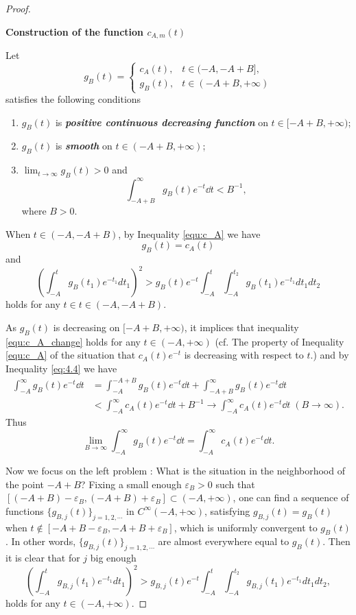 \documentclass[twoside,openany,12pt]{beautynote}
\newcommand{\itbf}[1]{\textbf{\itshape #1}}\newcommand{\supp}{\operatorname{Supp}}\newcommand{\xu}{\sqrt{-1}}
\begin{document}
\begin{proof}
  
  \begin{mdframed}
\begin{center}
  \textbf{Construction of the function $c_{A,m}(t)$}
\end{center}
Let 
\[
  g_B(t)=\begin{cases}
    c_A(t), & t\in (-A,-A+B],\\ 
    g_B(t), & t\in (-A+B,+\infty)
  \end{cases}
\]
satisfies the following conditions 
\begin{enumerate}
  \item $g_B(t)$ is \itbf{positive continuous decreasing function} on $t\in [-A+B,+\infty)$;
  \item $g_B(t)$ is \itbf{smooth} on $t\in (-A+B,+\infty)$;
  \item $\lim_{t\to\infty} g_B(t)>0$ and 
\begin{equation}
  \label{eq:4.4}
      \int_{-A+B}^{\infty} g_B(t) e^{-t} \dd t<B^{-1},
\end{equation}
  where $B>0$.
\end{enumerate}
  \end{mdframed}
When $t\in (-A,-A+B)$, by Inequality \eqref{equ:c_A} we have 
\[g_B(t)=c_A(t)\]
and 
\begin{equation}
  \label{equ:c_A_change}
  (\int_{-A}^{t}g_{B}(t_{1})e^{-t_{1}}dt_{1})^{2}>g_{B}(t)e^{-t}
  \int_{-A}^{t}\int_{-A}^{t_{2}}g_{B}(t_{1})e^{-t_{1}}dt_{1}dt_{2}
  \end{equation}
holds for any $t\in t\in (-A,-A+B)$.

As $g_B(t)$ is decreasing on $[-A+B,+\infty)$, it implices that inequality \eqref{equ:c_A_change} holds for any $t\in (-A,+\infty)$ (cf. The property of Inequality \eqref{equ:c_A} of the situation that $c_A(t)e^{-t}$ is decreasing with respect to $t$.) and by Inequality \eqref{eq:4.4} we have
\begin{align*}
  \int_{-A}^\infty g_B(t) e^{-t}\dd t &=\int_{-A}^{-A+B} g_B(t) e^{-t}\dd t +\int_{-A+B}^\infty g_B(t) e^{-t}\dd t\\ 
  &<\int_{-A}^\infty c_A(t) e^{-t}\dd t+B^{-1}\rightarrow \int_{-A}^\infty c_A(t) e^{-t}\dd t \;(B\to\infty).
\end{align*}
  Thus 
  \[
    \lim_{B\to\infty} \int_{-A}^\infty g_B(t) e^{-t}\dd t=\int_{-A}^\infty c_A(t) e^{-t}\dd t.
  \]

  Now we focus on the left problem : What is the situation in the neighborhood of the point $-A+B$? Fixing a small enough $\varepsilon_B>0$ such that $[(-A+B)-\varepsilon_B,(-A+B)+\varepsilon_B]\subset (-A,+\infty)$, one can find a sequence of functions
  $\{g_{B,j}(t)\}_{j=1,2,\cdots}$ in $C^{\infty}(-A,+\infty)$,
  satisfying $g_{B,j}(t)=g_{B}(t)$ when
  $t\notin[-A+B-\varepsilon_{B},-A+B+\varepsilon_{B}]$, which is
  uniformly convergent to $g_{B}(t)$. In other words, $\{g_{B,j}(t)\}_{j=1,2,\cdots}$ are almost everywhere equal to $g_B(t)$. Then it is clear that for $j$ big
  enough
  $$(\int_{-A}^{t}g_{B,j}(t_{1})e^{-t_{1}}dt_{1})^{2}
  >g_{B,j}(t)e^{-t}\int_{-A}^{t}
  \int_{-A}^{t_{2}}g_{B,j}(t_{1})e^{-t_{1}}dt_{1}dt_{2},
  $$
  holds for any $t\in(-A,+\infty)$.


\end{proof}
\end{document}
